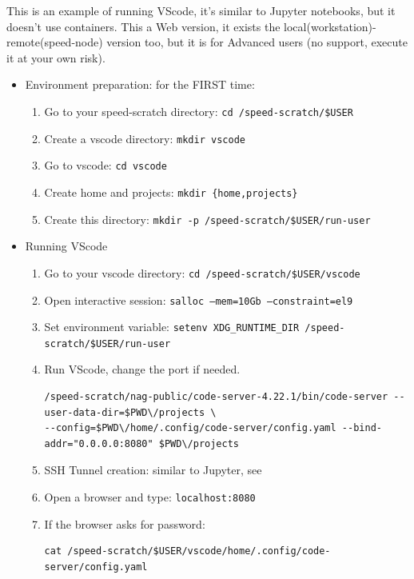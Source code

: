 This is an example of running VScode, it's similar to Jupyter notebooks, but it doesn't use containers.
This a Web version, it exists the local(workstation)-remote(speed-node) version too, but it is for Advanced users (no support, execute it at your own risk).

\begin{itemize}
\item
Environment preparation: for the FIRST time:
\begin{enumerate}
\item
Go to your speed-scratch directory: \texttt{cd /speed-scratch/\$USER}
\item
Create a vscode directory: \texttt{mkdir vscode}
\item
Go to vscode: \texttt{cd vscode}
\item
Create home and projects: \texttt{mkdir \{home,projects\}}
\item
Create this directory: \texttt {mkdir -p /speed-scratch/\$USER/run-user}
\end{enumerate}
\item
Running VScode
\begin{enumerate}
\item 
Go to your vscode directory: \texttt{cd /speed-scratch/\$USER/vscode}
\item
Open interactive session: \texttt {salloc --mem=10Gb --constraint=el9}
\item
Set environment variable: \texttt {setenv XDG\_RUNTIME\_DIR /speed-scratch/\$USER/run-user}
\item 
Run VScode, change the port if needed.
\scriptsize
\begin{verbatim}
/speed-scratch/nag-public/code-server-4.22.1/bin/code-server --user-data-dir=$PWD\/projects \
--config=$PWD\/home/.config/code-server/config.yaml --bind-addr="0.0.0.0:8080" $PWD\/projects
\end{verbatim}
\normalsize
\item
SSH Tunnel creation: similar to Jupyter, see 
\item
Open a browser and type: \texttt {localhost:8080}
\item
If the browser asks for password: 
\begin{verbatim}
cat /speed-scratch/$USER/vscode/home/.config/code-server/config.yaml
\end{verbatim}

\end{enumerate}
\end{itemize}

